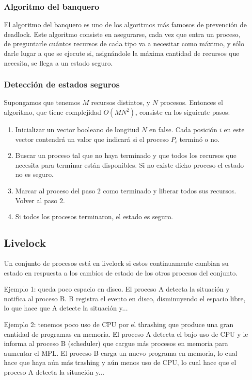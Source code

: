 \documentclass{article}
\begin{document}
\subsubsection{Algoritmo del banquero}

El algoritmo del banquero es uno de los algoritmos m\'as famosos de prevenci\'on de deadlock. Este algoritmo consiste en asegurarse, cada vez que entra un proceso, de preguntarle cu\'antos recursos de cada tipo va a necesitar como m\'aximo, y s\'olo darle lugar a que se ejecute si, asign\'andole la m\'axima cantidad de recursos que necesita, se llega a un estado seguro.

\subsubsection{Detecci\'on de estados seguros}

Supongamos que tenemos $M$ recursos distintos, y $N$ procesos. Entonces el algoritmo, que tiene complejidad $O(MN^2)$, consiste en los siguiente pasos:

\begin{enumerate}
\item Inicializar un vector booleano de longitud $N$ en false. Cada posición $i$ en este vector contendrá un valor que indicará si el proceso $P_i$ terminó o no.
\item Buscar un proceso tal que no haya terminado y que todos los recursos que necesita para terminar est\'an disponibles. Si no existe dicho proceso el estado no es seguro.
\item Marcar al proceso del paso 2 como terminado y liberar todos sus recursos. Volver al paso 2.
\item Si todos los procesos terminaron, el estado es seguro.
\end{enumerate}

\subsection{Livelock}
Un conjunto de procesos está en livelock si estos continuamente cambian su estado en respuesta a los cambios de estado de los otros procesos del conjunto.

Ejemplo 1: queda poco espacio en disco. El proceso A detecta la situación y notifica al proceso B. B registra el evento en disco, disminuyendo el espacio libre, lo que hace que A detecte la situación y...

Ejemplo 2: tenemos poco uso de CPU por el thrashing que produce una gran cantidad de programas en memoria. El proceso A detecta el bajo uso de CPU y le informa al proceso B (scheduler) que cargue más procesos en memoria para aumentar el MPL. El proceso B carga un nuevo programa en memoria, lo cual hace que haya aún más trashing y aún menos uso de CPU, lo cual hace que el proceso A detecta la situación y...
\end{document}
